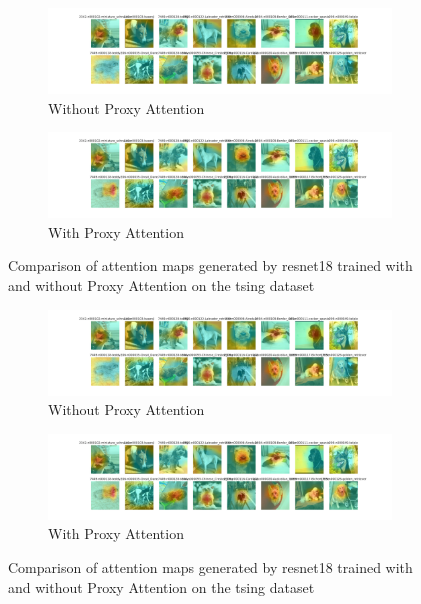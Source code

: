 
    \begin{figure}[H]
        \centering
        \begin{subfigure}[b]{1\textwidth}
            \includegraphics[width=\textwidth]{images/tsing_resnet18_noproxy_0.pdf}
            \caption{Without Proxy Attention}
        \end{subfigure}
        \hfill
        \begin{subfigure}[b]{1\textwidth}
            \includegraphics[width=\textwidth]{images/tsing_resnet18_proxy_0.pdf}
            \caption{With Proxy Attention}
        \end{subfigure}
        \caption{Comparison of attention maps generated by resnet18 trained with and without Proxy Attention on the tsing dataset}
    \end{figure}
    

    \begin{figure}[H]
        \centering
        \begin{subfigure}[b]{1\textwidth}
            \includegraphics[width=\textwidth]{images/tsing_resnet18_noproxy_0.pdf}
            \caption{Without Proxy Attention}
        \end{subfigure}
        \hfill
        \begin{subfigure}[b]{1\textwidth}
            \includegraphics[width=\textwidth]{images/tsing_resnet18_proxy_0.pdf}
            \caption{With Proxy Attention}
        \end{subfigure}
        \caption{Comparison of attention maps generated by resnet18 trained with and without Proxy Attention on the tsing dataset}
    \end{figure}
    

